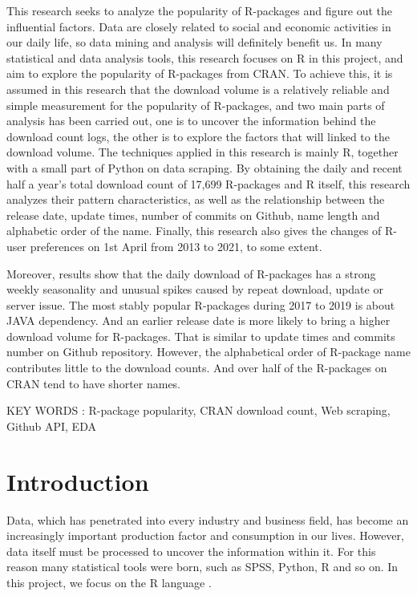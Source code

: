 \documentclass[
]{book}
\begin{document}
This research seeks to analyze the popularity of R-packages and figure out the influential factors. Data are closely related to social and economic activities in our daily life, so data mining and analysis will definitely benefit us. In many statistical and data analysis tools, this research focuses on R in this project, and aim to explore the popularity of R-packages from CRAN. To achieve this, it is assumed in this research that the download volume is a relatively reliable and simple measurement for the popularity of R-packages, and two main parts of analysis has been carried out, one is to uncover the information behind the download count logs, the other is to explore the factors that will linked to the download volume. The techniques applied in this research is mainly R, together with a small part of Python on data scraping. By obtaining the daily and recent half a year's total download count of 17,699 R-packages and R itself, this research analyzes their pattern characteristics, as well as the relationship between the release date, update times, number of commits on Github, name length and alphabetic order of the name. Finally, this research also gives the changes of R-user preferences on 1st April from 2013 to 2021, to some extent.

Moreover, results show that the daily download of R-packages has a strong weekly seasonality and unusual spikes caused by repeat download, update or server issue. The most stably popular R-packages during 2017 to 2019 is about JAVA dependency. And an earlier release date is more likely to bring a higher download volume for R-packages. That is similar to update times and commits number on Github repository. However, the alphabetical order of R-package name contributes little to the download counts. And over half of the R-packages on CRAN tend to have shorter names.

KEY WORDS : R-package popularity, CRAN download count, Web scraping, Github API, EDA

\hypertarget{intro}{%
\chapter{Introduction}\label{intro}}

Data, which has penetrated into every industry and business field, has become an increasingly important production factor and consumption in our lives. However, data itself must be processed to uncover the information within it. For this reason many statistical tools were born, such as SPSS, Python, R and so on. In this project, we focus on the R language \autocite{R-base}.
\end{document}
